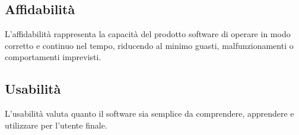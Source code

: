 \subsection{Affidabilità}
L’affidabilità rappresenta la capacità del prodotto software di operare in modo corretto e continuo nel tempo, riducendo al minimo guasti, malfunzionamenti o comportamenti imprevisti.
\begin{table}[h]
    \centering
    \renewcommand{\arraystretch}{1.15}
    \vspace{-0.3cm}
    \caption{Affidabilità del prodotto}
\end{table}

\subsection{Usabilità}
L’usabilità valuta quanto il software sia semplice da comprendere, apprendere e utilizzare per l’utente finale. 
\begin{table}[h]
    \centering
    \renewcommand{\arraystretch}{1.15}
    \vspace{-0.3cm}
    \caption{Usabilità del prodotto}
\end{table}

